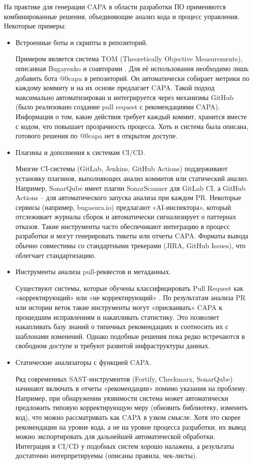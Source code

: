 На практике для генерации CAPA в области разработки ПО применяются комбинированные решения, объединяющие анализ кода и процесс управления. Некоторые примеры:

\begin{itemize}
	\item Встроенные боты и скрипты в репозиторий. 
	
	Примером является система TOM (Theoretically Objective Measurements), описанная Bugayenko  и соавторами \cite{Bugayenko2022}. Для её использования необходимо лишь добавить бота @0capa в репозиторий. Он автоматически собирает метрики по каждому коммиту и на их основе предлагает CAPA. Такой подход максимально автоматизирован и интегрируется через механизмы GitHub (было реализовано создание pull request с рекомендациями CAPA). Информация о том, какие действия требует каждый коммит, хранится вместе с кодом, что повышает прозрачность процесса. Хоть и система была описана, готового решения по @0capa нет в открытом доступе.
	
	\item Плагины и дополнения к системам CI/CD.
	
	Многие CI-системы (GitLab, Jenkins, GitHub Actions) поддерживают установку плагинов, выполняющих анализ коммитов или статический анализ. Например, SonarQube имеет плагин SonarScanner для GitLab CI, а GitHub Actions – для автоматического запуска анализа при каждом PR. Некоторые сервисы (например, bugasura.io) предлагают «AI-инспектора», который отслеживает журналы сборок и автоматически сигнализирует о паттернах отказов. Такие инструменты часто обеспечивают интеграцию в процесс разработки и могут генерировать тикеты или отчеты CAPA. Форматы вывода обычно совместимы со стандартными трекерами (JIRA, GitHub Issues), что облегчает стандартизацию.
	
	\item Инструменты анализа pull-реквестов и метаданных.
	
	Существуют системы, которые обучены классифицировать Pull Request как «корректирующий» или «не корректирующий» \cite{Bugayenko2022}. По результатам анализа PR или истории веток такие инструменты могут «присваивать» CAPA к прошедшим исправлениям и накапливать статистику.  Это позволяет накапливать базу знаний о типичных рекомендациях и соотносить их с шаблонами изменений. Однако подобные решения пока редко встречаются в свободном доступе и требуют развитой инфраструктуры данных. \cite{Bugayenko2022}
	\item Статические анализаторы с функцией CAPA. 
	
	 Ряд современных SAST-инструментов (Fortify, Checkmarx, SonarQube) начинают включать в отчеты «рекомендации» помимо указания на проблему. Например, при обнаружении уязвимости система может автоматически предложить типовую корректирующую меру (обновить библиотеку, изменить код), что можно рассматривать как CAPA в узком смысле. Хотя это скорее рекомендации на уровне кода, а не на уровне процесса разработки, их вывод можно экспортировать для дальнейшей автоматической обработки. Интеграция в CI/CD у подобных систем хорошо налажена, а результаты достаточно интерпретируемы (описаны правила, чек-листы).
\end{itemize}

